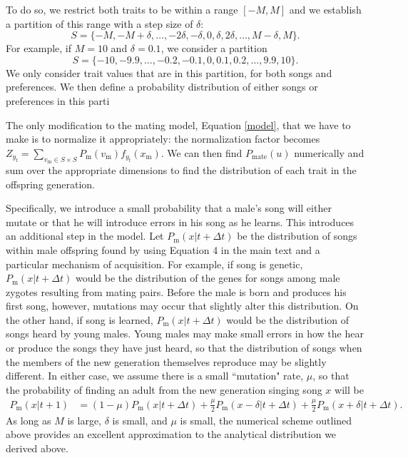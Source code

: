 \documentclass{article}
\newcommand{\x}[1]{\text{#1}}
\begin{document}
 To do so, we restrict both traits to be within a range $[-M,M]$ and we establish a partition of this range with a step size of $\delta$:
$$
S=\{-M,-M+\delta,\dots,-2\delta,-\delta,0,\delta,2\delta,\dots,M-\delta,M\}.$$
For example, if $M=10$ and $\delta=0.1$, we consider a partition $$S=\{-10,-9.9,\dots,-0.2,-0.1,0,0.1,0.2,\dots,9.9,10\}.$$
We only consider trait values that are in this partition, for both songs and preferences.
We then define a probability distribution of either songs or preferences in this parti
 
The only modification to the mating model, Equation \ref{model}, that we have to make is to normalize it appropriately: the normalization factor becomes  
$Z_{y_\x{f}}=\sum_{v_\x{m}\in S\times S}P_\x{m}(v_\x{m})f_{y_\x{f}}(x_\x{m})$. We can then find $P_\text{mate}(u)$ numerically and sum over the appropriate dimensions to find the distribution of each trait in the offspring generation. 

Specifically, we introduce a small probability that a male's song will either mutate or that he will introduce errors in his song as he learns. This introduces an additional step in the model. Let $P_\x{m}\left(x|t+\Delta t\right)$ be the distribution of songs within male offspring found by using Equation 4 in the main text and a particular mechanism of acquisition. For example, if song is genetic, $P_\x{m}\left(x|t+\Delta t\right)$ would be the distribution of the genes for songs among male zygotes resulting from mating pairs. Before the male is born and produces his first song, however, mutations may occur that slightly alter this distribution. On the other hand, if song is learned, $P_\x{m}\left(x|t+\Delta t\right)$ would be the distribution of songs heard by young males. Young males may make small errors in how the hear or produce the songs they have just heard, so that the distribution of songs when the members of the new generation themselves reproduce may be slightly different. In either case, we assume there is a small ``mutation" rate, $\mu$, so that the probability of finding an adult from the new generation singing song $x$ will be 
\begin{align*}
P_\x{m}(x|t+1)&=(1-\mu)P_\x{m}(x|t+\Delta t)+\frac{\mu}{2}P_\x{m}(x-\delta|t+\Delta t)+\frac{\mu}{2}P_\x{m}(x+\delta|t+\Delta t).
\end{align*}  
As long as $M$ is large, $\delta$ is small, and $\mu$ is small, the numerical scheme outlined above provides an excellent approximation to the analytical distribution we derived above. %
\end{document}
